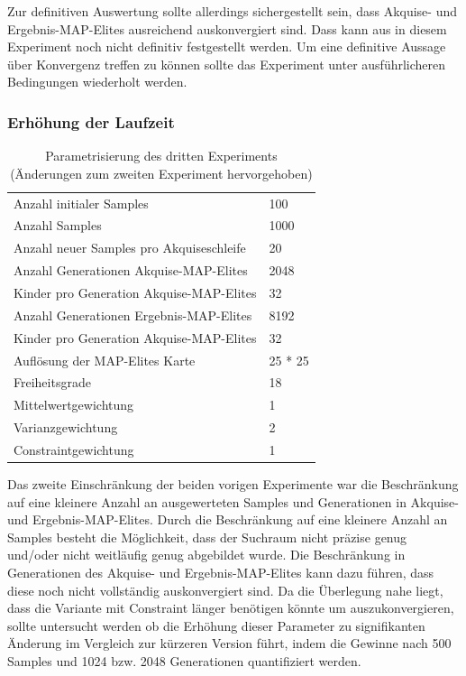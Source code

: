 
Zur definitiven Auswertung sollte allerdings sichergestellt sein, dass Akquise- und Ergebnis-MAP-Elites ausreichend auskonvergiert sind.
Dass kann aus in diesem Experiment noch nicht definitiv festgestellt werden.
Um eine definitive Aussage über Konvergenz treffen zu können sollte das Experiment unter ausführlicheren Bedingungen wiederholt werden.

\subsubsection{Erhöhung der Laufzeit}
\label{sub:exp3rd}
\begin{table}[h]
	\centering
	\begin{tabularx}{.75\textwidth}{ll}\hline
		Anzahl initialer Samples & 100 \\
		Anzahl Samples & 1000 \\
		Anzahl neuer Samples pro Akquiseschleife & 20 \\
		Anzahl Generationen Akquise-MAP-Elites & 2048 \\
		Kinder pro Generation Akquise-MAP-Elites & 32 \\
		Anzahl Generationen Ergebnis-MAP-Elites & 8192 \\
		Kinder pro Generation Akquise-MAP-Elites & 32 \\
		Auflösung der MAP-Elites Karte & 25 * 25  \\
		\hline
		Freiheitsgrade & 18 \\
		Mittelwertgewichtung & 1 \\
		Varianzgewichtung & 2 \\
		Constraintgewichtung & 1 \\
	\end{tabularx}
	\label{tab:params3rd}
	\caption{Parametrisierung des dritten Experiments (Änderungen zum zweiten Experiment hervorgehoben)}
\end{table}

Das zweite Einschränkung der beiden vorigen Experimente war die Beschränkung auf eine kleinere Anzahl an ausgewerteten Samples und Generationen in Akquise- und Ergebnis-MAP-Elites.
Durch die Beschränkung auf eine kleinere Anzahl an Samples besteht die Möglichkeit, dass der Suchraum nicht präzise genug und/oder nicht weitläufig genug abgebildet wurde.
Die Beschränkung in Generationen des Akquise- und Ergebnis-MAP-Elites kann dazu führen, dass diese noch nicht vollständig auskonvergiert sind.
Da die Überlegung nahe liegt, dass die Variante mit Constraint länger benötigen könnte um auszukonvergieren, sollte untersucht werden ob die Erhöhung dieser Parameter zu signifikanten Änderung im Vergleich zur kürzeren Version führt, indem die Gewinne nach 500 Samples und 1024 bzw. 2048 Generationen quantifiziert werden.

